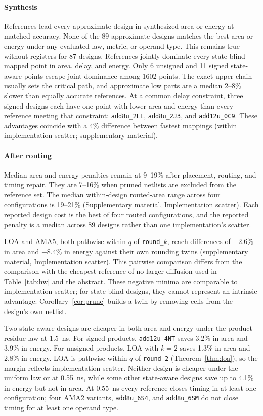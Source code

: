 \documentclass[preprint,12pt,numbers]{elsarticle}
\theoremstyle{definition}
\begin{document}
\paragraph{Synthesis}
References lead every approximate design in synthesized area or
energy at matched accuracy. None of the 89 approximate designs matches
the best area or energy under any evaluated law, metric, or operand
type. This remains true without registers for 87 designs.
References jointly dominate every state-blind mapped point in area,
delay, and energy. Only 6 unsigned and 11 signed state-aware points
escape joint dominance among 1602 points. The exact upper chain
usually sets the critical path, and approximate low parts are a median
2--8\% slower than equally accurate references.
At a common delay constraint, three signed designs each have one
point with lower area and energy than every reference meeting that
constraint: \texttt{add8u\_2LL}, \texttt{add8u\_2J3}, and
\texttt{add12u\_0C9}. These advantages coincide with a 4\% difference
between fastest mappings (within implementation scatter; supplementary
material).

\paragraph{After routing}
Median area and energy penalties remain at 9--19\% after placement,
routing, and timing repair. They are 7--16\% when pruned netlists are
excluded from the reference set. The median within-design routed-area
range across four configurations is 19--21\% (Supplementary material,
Implementation scatter). Each reported design cost is the best of four
routed configurations, and the reported penalty is a median across 89
designs rather than one implementation's scatter.

LOA and AMA5, both pathwise within $q$ of \texttt{round\_$k$},
reach differences of $-2.6\%$ in area and $-8.4\%$ in energy against their
own rounding twins (supplementary material, Implementation scatter).
This pairwise comparison differs from the comparison with the cheapest
reference of no larger diffusion used in Table~\ref{tab:hw} and the
abstract. These negative minima are comparable
to implementation scatter; for state-blind designs, they cannot represent
an intrinsic advantage: Corollary~\ref{cor:prune} builds a twin by removing
cells from the design's own netlist.

Two state-aware designs are cheaper in both area and energy under
the product-residue law at 1.5~ns. For signed products, \texttt{add12u\_4NT}
saves 3.2\% in area and 3.9\% in energy. For unsigned products, LOA with
$k=2$ saves 1.3\% in area and 2.8\% in energy. LOA is pathwise within $q$
of \texttt{round\_2} (Theorem~\ref{thm:loa}), so the margin reflects
implementation scatter. Neither
design is cheaper under the uniform law or at 0.55~ns, while some other
state-aware designs save up to 4.1\% in energy but not in area.
At 0.55~ns every reference closes timing in at least one configuration;
four AMA2 variants, \texttt{add8u\_6S4}, and \texttt{add8u\_6SM} do not
close timing for at least one operand type.
\end{document}
